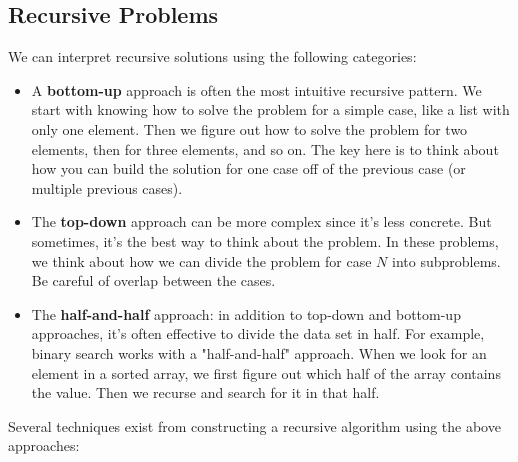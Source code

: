 \documentclass{article}
\begin{document}
    \subsection{Recursive Problems}
    We can interpret recursive solutions using the following categories:
    \begin{itemize}
        \item A \textbf{bottom-up} approach is often the most intuitive recursive pattern. We start with knowing how to solve the problem for a simple case, like a list with only one element. Then we figure out how to solve the problem for two elements, then for three elements, and so on. The key here is to think about how you can build the solution for one case off of the previous case (or multiple previous cases).
        
        \item The \textbf{top-down} approach can be more complex since it's less concrete. But sometimes, it's the best way to think about the problem. In these problems, we think about how we can divide the problem for case $N$ into subproblems. Be careful of overlap between the cases. 
        
        \item The \textbf{half-and-half} approach: in addition to top-down and bottom-up approaches, it's often effective to divide the data set in half. For example, binary search works with a "half-and-half" approach. When we look for an element in a sorted array, we first figure out which half of the array contains the value. Then we recurse and search for it in that half.
    \end{itemize}
    
    Several techniques exist from constructing a recursive algorithm using the above approaches: 
    
\end{document}
